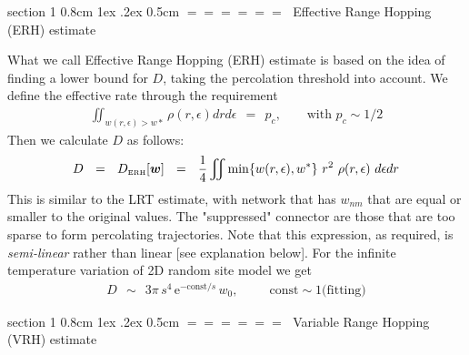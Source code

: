 \documentclass[onecolumn,fleqn,notitlepage,secnumarabic]{revtex4}
\makeatletter
\newcommand{\const}{\mbox{const}}
\newcommand{\eexp}{\mbox{e}^}
\newcommand{\tbox}[1]{\mbox{\tiny #1}}
\newcommand{\beq}{\begin{eqnarray}}
\newcommand{\eeq}{\end{eqnarray}}
\def\section{%
  \@startsection
    {section}%
    {1}%
    {\z@}%
    {0.8cm \@plus1ex \@minus .2ex}%
    {0.5cm}%
    {\Large\bf $=\!=\!=\!=\!=\!=\;$}%
}%
\makeatother
\begin{document}
\section{Effective Range Hopping (ERH) estimate}

What we call Effective Range Hopping (ERH) estimate is based 
on the idea of finding a lower bound for $D$, taking the 
percolation threshold into account. We define the effective rate 
through the requirement 
%
\beq
\iint_{w(r,\epsilon)>w*} \rho(r,\epsilon)drd\epsilon \ \ = \ \ p_c, 
\ \ \ \ \ \ \ \ \ \mbox{with $p_c\sim 1/2$}
\eeq
%
Then we calculate $D$ as follows:
%
\beq
D \ \ = \ \ D_{\tbox{ERH}}[\bm{w}]  \ \ = \ \ \frac{1}{4}\iint \min\{w(r,\epsilon),w^*\} \ r^2  \ \rho(r,\epsilon) \ d\epsilon dr
\eeq
%
This is similar to the LRT estimate, with network that has $w_{nm}$ 
that are equal or smaller to the original values. The "suppressed" 
connector are those that are too sparse to form percolating trajectories. 
Note that this expression, as required, is {\em semi-linear} 
rather than linear [see explanation below].
For the infinite temperature variation of 2D random site model we get  
%
\beq
D \ \ \sim \ \ 3\pi \, s^4 \, \eexp{-\const/s} \, w_0, 
\ \ \ \ \ \ \ \ \ \ \ \const\sim 1 \mbox{(fitting)} 
\eeq


\section{Variable Range Hopping (VRH) estimate}
\end{document}
